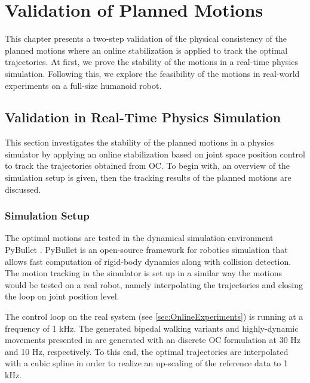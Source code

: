 
\chapter{Validation of Planned Motions}\label{c6}
This chapter presents a two-step validation of the physical consistency of the planned motions where an online stabilization is applied to track the optimal trajectories. At first, we prove the stability of the motions in a real-time physics simulation. Following this, we explore the feasibility of the motions in real-world experiments on a full-size humanoid robot.    

\section{Validation in Real-Time Physics Simulation}\label{sec:OnlineSimulation}
This section investigates the stability of the planned motions in a physics simulator by applying an online stabilization based on joint space position control to track the trajectories obtained from \gls{OC}. To begin with, an overview of the simulation setup is given, then the tracking results of the planned motions are discussed. 

\subsection{Simulation Setup}
The optimal motions are tested in the dynamical simulation environment PyBullet \cite{coumans2016pybullet}. PyBullet is an open-source framework for robotics simulation that allows fast computation of rigid-body dynamics along with collision detection. 
The motion tracking in the simulator is set up in a similar way the motions would be tested on a real robot, namely interpolating the trajectories and closing the loop on joint position level.

The control loop on the real system (see \cref{sec:OnlineExperiments}) is running at a frequency of 1 kHz. The generated bipedal walking variants and highly-dynamic movements presented in  are generated with an discrete \gls{OC} formulation at 30 Hz and 10 Hz, respectively. To this end, the optimal trajectories are interpolated with a cubic spline in order to realize an up-scaling of the reference data to 1 kHz.  


